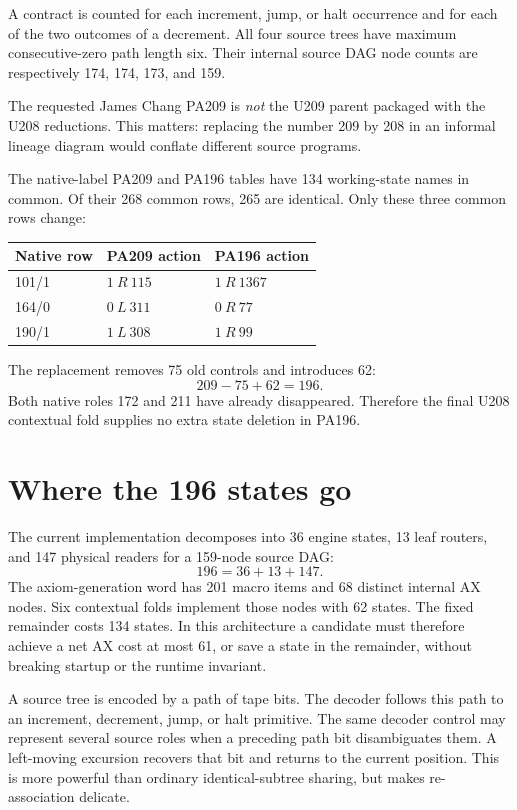 \documentclass[11pt,a4paper]{article}
\begin{document}
A contract is counted for each increment, jump, or halt occurrence and for each of the two outcomes of a decrement. All four source trees have maximum consecutive-zero path length six. Their internal source DAG node counts are respectively 174, 174, 173, and 159.

The requested James Chang PA209 is \emph{not} the U209 parent packaged with the U208 reductions. This matters: replacing the number 209 by 208 in an informal lineage diagram would conflate different source programs.

The native-label PA209 and PA196 tables have 134 working-state names in common. Of their 268 common rows, 265 are identical. Only these three common rows change:
\begin{center}
\begin{tabular}{lll}
\toprule
Native row & PA209 action & PA196 action\\
\midrule
101/1 & $1\ R\ 115$ & $1\ R\ 1367$\\
164/0 & $0\ L\ 311$ & $0\ R\ 77$\\
190/1 & $1\ L\ 308$ & $1\ R\ 99$\\
\bottomrule
\end{tabular}
\end{center}
The replacement removes 75 old controls and introduces 62:
\[
209-75+62=196.
\]
Both native roles 172 and 211 have already disappeared. Therefore the final U208 contextual fold supplies no extra state deletion in PA196.

\section{Where the 196 states go}

The current implementation decomposes into 36 engine states, 13 leaf routers, and 147 physical readers for a 159-node source DAG:
\[
196=36+13+147.
\]
The axiom-generation word has 201 macro items and 68 distinct internal AX nodes. Six contextual folds implement those nodes with 62 states. The fixed remainder costs 134 states. In this architecture a candidate must therefore achieve a net AX cost at most 61, or save a state in the remainder, without breaking startup or the runtime invariant.

A source tree is encoded by a path of tape bits. The decoder follows this path to an increment, decrement, jump, or halt primitive. The same decoder control may represent several source roles when a preceding path bit disambiguates them. A left-moving excursion recovers that bit and returns to the current position. This is more powerful than ordinary identical-subtree sharing, but makes re-association delicate.
\end{document}
